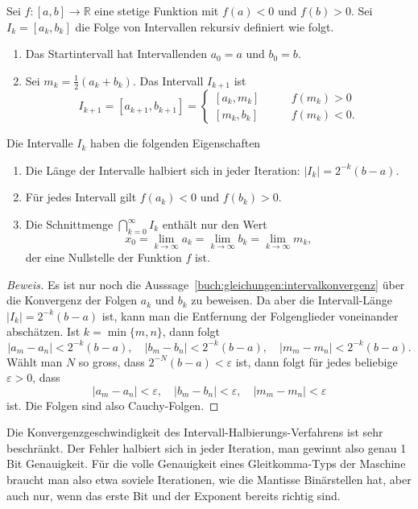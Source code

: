 \begin{satz}[Intervallhalbierung]
%
Sei $f\colon[a,b]\to\mathbb R$ eine stetige Funktion mit $f(a)<0$ und
$f(b)>0$.
Sei $I_k=[a_k,b_k]$ die Folge von Intervallen rekursiv definiert wie folgt.
\begin{enumerate}
\item
Das Startintervall hat Intervallenden $a_0=a$ und $b_0=b$.
\item
Sei $m_k = \frac12(a_k+b_k)$.
Das Intervall $I_{k+1}$ ist 
\[
I_{k+1} = [a_{k+1},b_{k+1}] = 
\begin{cases}
[a_k,m_k]&\qquad f(m_k) > 0\\[5pt]
[m_k,b_k]&\qquad f(m_k) < 0.
\end{cases}
\]
\end{enumerate}
Die Intervalle $I_k$ haben die folgenden Eigenschaften
\begin{enumerate}
\item
Die Länge der Intervalle halbiert sich in jeder Iteration: $|I_k|=2^{-k}(b-a)$.
\item
Für jedes Intervall gilt $f(a_k)<0$ und $f(b_k)> 0$.
\item
Die Schnittmenge
$\bigcap_{k=0}^\infty I_k$ enthält nur den Wert
\begin{equation}
x_0 = \lim_{k\to\infty}a_k=\lim_{k\to\infty}b_k=\lim_{k\to\infty}m_k,
\label{buch:gleichungen:intervalkonvergenz}
\end{equation}
der eine Nullstelle der Funktion $f$ ist.
\end{enumerate}
\end{satz}

\begin{proof}[Beweis]
Es ist nur noch die Ausssage~\eqref{buch:gleichungen:intervalkonvergenz}
über die Konvergenz der Folgen $a_k$ und $b_k$
zu beweisen.
Da aber die Intervall-Länge $|I_k|=2^{-k}(b-a)$ ist, kann man die
Entfernung der Folgenglieder voneinander abschätzen.
Ist $k=\min\{m,n\}$, dann folgt
\[
|a_m-a_n| < 2^{-k}(b-a),\quad
|b_m-b_n| < 2^{-k}(b-a),\quad
|m_m-m_n| < 2^{-k}(b-a).
\]
Wählt man $N$ so gross, dass $2^{-N}(b-a)<\varepsilon$ ist, dann
folgt für jedes beliebige $\varepsilon>0$, dass 
\[
|a_m-a_n|<\varepsilon,\quad
|b_m-b_n|<\varepsilon,\quad
|m_m-m_n|<\varepsilon
\]
ist.
Die Folgen sind also Cauchy-Folgen.
%
\end{proof}

Die Konvergenzgeschwindigkeit des Intervall-Halbierungs-Verfahrens ist
sehr beschränkt.
%
%
Der Fehler halbiert sich in jeder Iteration, man gewinnt also genau
1 Bit Genauigkeit.
Für die volle Genauigkeit eines Gleitkomma-Typs der Maschine braucht
man also etwa soviele Iterationen, wie die Mantisse Binärstellen hat,
aber auch nur, wenn das erste Bit und der Exponent bereits richtig
sind.
%
%

